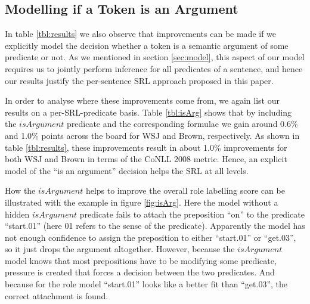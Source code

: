 


\subsection{Modelling if a Token is an Argument}
In table \ref{tbl:results} we also observe that improvements can be made if we explicitly model the decision whether a token is a semantic argument of some predicate or not. As we mentioned in section \ref{sec:model}, this aspect of our model requires us to jointly perform inference for all predicates of a sentence, and hence our results justify the per-sentence SRL approach proposed in this paper.

In order to analyse where these improvements come from, we again list our results on a per-SRL-predicate basis. Table \ref{tbl:isArg} shows that by including the $isArgument$ predicate and the corresponding formulae we gain around 0.6\% and 1.0\% points across the board for WSJ and Brown, respectively. As shown in table \ref{tbl:results}, these improvements result in about 1.0\% improvements for both WSJ and Brown in terms of the CoNLL 2008 metric. Hence, an explicit model of the ``is an argument'' decision helps the SRL at all levels. 

How the $isArgument$ helps to improve the overall role labelling score can be illustrated with the example in figure \ref{fig:isArg}. Here the model without a hidden $isArgument$ predicate fails to attach the preposition ``on'' to the predicate ``start.01'' (here 01 refers to the sense of the predicate). Apparently the model has not enough confidence to assign the preposition to either ``start.01'' or ``get.03'', so it just drops the argument altogether. However, because the $isArgument$ model knows that most prepositions have to be modifying some predicate, pressure is created that forces a decision between the two predicates. And because for the role model ``start.01'' looks like a better fit than ``get.03'', the correct attachment is found.


